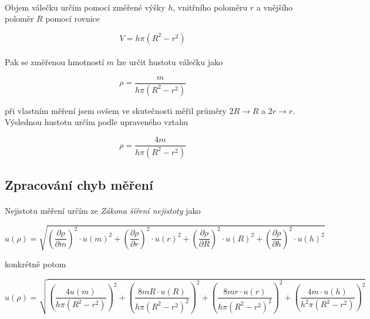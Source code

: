 \documentclass[a4paper,11pt]{article}
\begin{document}
    \paragraph{} Objem válečku určím pomocí změřené výšky $h$, vnitřního poloměru $r$ a
    vnějšího poloměr $R$ pomocí rovnice

    \begin{equation}
    V = h \pi (R^{2} - r^{2})
    \end{equation}

    \paragraph{} Pak se změřenou hmotností $m$ lze určit hustotu válečku jako

    \begin{equation}
    \rho = \frac{m}{h \pi (R^{2} - r^{2})}
    \end{equation}

    při vlastním měření jsem ovšem ve skutečnosti měřil průměry $2R \to R$ a
    $2r \to r$. Výslednou hustotu určím podle upraveného vztahu

    \begin{equation}
    \rho = \frac{4m}{h \pi (R^{2} - r^{2})}
    \end{equation}

    \subsection{Zpracování chyb měření}

        \paragraph{} Nejistotu měření určím ze \textit{Zákona šíření nejistoty} jako

        \begin{equation}
        u(\rho) = \sqrt{
          \left(\frac{\partial \rho}{\partial m}\right)^{2} \cdot u(m)^{2}
        + \left(\frac{\partial \rho}{\partial r}\right)^{2} \cdot u(r)^{2} 
        + \left(\frac{\partial \rho}{\partial R}\right)^{2} \cdot u(R)^{2}
        + \left(\frac{\partial \rho}{\partial h}\right)^{2} \cdot u(h)^{2}
        }
        \end{equation}

        konkrétně potom

        \begin{equation}
        u(\rho) = \sqrt{
              \left(\frac{4u(m)}{h \pi \left(R^{2} - r^{2}\right)}\right)^{2}
            + \left(\frac{8mR \cdot u(R)}{h \pi \left(R^{2} - r^{2}\right)^{2}}\right)^{2}
            + \left(\frac{8mr \cdot u(r)}{h \pi \left(R^{2} - r^{2}\right)^{2}}\right)^{2}
            + \left(\frac{4m \cdot u(h)}{h^{2} \pi \left(R^{2} - r^{2}\right)}\right)^{2}
        }
        \end{equation}
\end{document}
